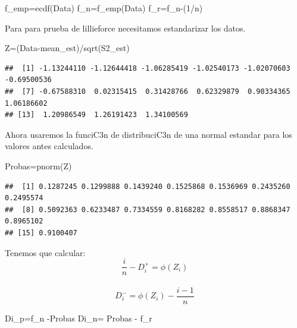 \documentclass[
]{article}
\newenvironment{Shaded}{\begin{snugshade}}{\end{snugshade}}
\newcommand{\DecValTok}[1]{\textcolor[rgb]{0.00,0.00,0.81}{#1}}
\newcommand{\FunctionTok}[1]{\textcolor[rgb]{0.00,0.00,0.00}{#1}}
\newcommand{\NormalTok}[1]{#1}
\newcommand{\OtherTok}[1]{\textcolor[rgb]{0.56,0.35,0.01}{#1}}
\newcommand{\SpecialCharTok}[1]{\textcolor[rgb]{0.00,0.00,0.00}{#1}}
\begin{document}
\begin{Shaded}
\begin{Highlighting}[]
\NormalTok{f\_emp}\OtherTok{=}\FunctionTok{ecdf}\NormalTok{(Data)}
\NormalTok{f\_n}\OtherTok{=}\FunctionTok{f\_emp}\NormalTok{(Data)}
\NormalTok{f\_r}\OtherTok{=}\NormalTok{f\_n}\SpecialCharTok{{-}}\NormalTok{(}\DecValTok{1}\SpecialCharTok{/}\NormalTok{n) }
\end{Highlighting}
\end{Shaded}

Para para prueba de lillieforce necesitamos estandarizar los datos.

\begin{Shaded}
\begin{Highlighting}[]
\NormalTok{Z}\OtherTok{=}\NormalTok{(Data}\SpecialCharTok{{-}}\NormalTok{mean\_est)}\SpecialCharTok{/}\FunctionTok{sqrt}\NormalTok{(S2\_est)}
\end{Highlighting}
\end{Shaded}

\begin{verbatim}
##  [1] -1.13244110 -1.12644418 -1.06285419 -1.02540173 -1.02070603 -0.69500536
##  [7] -0.67588310  0.02315415  0.31428766  0.62329879  0.90334365  1.06186602
## [13]  1.20986549  1.26191423  1.34100569
\end{verbatim}

Ahora usaremos la funciC3n de distribuciC3n de una normal estandar para
los valores antes calculados.

\begin{Shaded}
\begin{Highlighting}[]
\NormalTok{Probas}\OtherTok{=}\FunctionTok{pnorm}\NormalTok{(Z)}
\end{Highlighting}
\end{Shaded}

\begin{verbatim}
##  [1] 0.1287245 0.1299888 0.1439240 0.1525868 0.1536969 0.2435260 0.2495574
##  [8] 0.5092363 0.6233487 0.7334559 0.8168282 0.8558517 0.8868347 0.8965102
## [15] 0.9100407
\end{verbatim}

Tenemos que calcular: \[ \frac{i}{n} - D_{i}^{+}=  \phi(Z_{i}) \]\\
\[D_{i}^{-}=  \phi(Z_{i}) - \frac{i-1}{n}\]

\begin{Shaded}
\begin{Highlighting}[]
\NormalTok{Di\_p}\OtherTok{=}\NormalTok{f\_n  }\SpecialCharTok{{-}}\NormalTok{Probas}
\NormalTok{Di\_n}\OtherTok{=}\NormalTok{ Probas }\SpecialCharTok{{-}}\NormalTok{ f\_r}
\end{Highlighting}
\end{Shaded}
\end{document}

